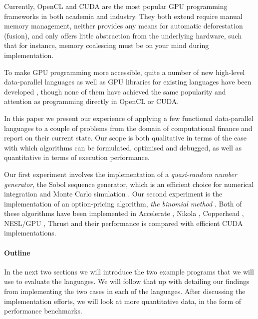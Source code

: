 \documentclass[preprint]{sigplanconf}
\begin{document}
Currently, OpenCL and CUDA are the most popular GPU programming
frameworks in both academia and industry. They both extend require
manual memory management, neither provides any means for automatic
deforestation (fusion), and only offers little abstraction from the
underlying hardware, such that for instance, memory coalescing must be
on your mind during implementation.

To make GPU programming more accessible, quite a number of new
high-level data-parallel languages as well as GPU libraries for
existing languages have been developed \cite{Catanzaro2011,
  chakravarty2011accelerating, mainland2010nikola,
  svensson2011obsidian, bergstra2010theano, homepage:rgpu,
  bergstrom2012nested, homepage:bohrium}, though none of them have
achieved the same popularity and attention as programming directly in
OpenCL or CUDA.

In this paper we present our experience of applying a few functional
data-parallel languages to a couple of problems from the domain of
computational finance and report on their current state. Our scope is
both qualitative in terms of the ease with which algorithms can be
formulated, optimised and debugged, as well as quantitative in terms
of execution performance.

Our first experiment involves the implementation of a
\emph{quasi-random number generator}, the Sobol sequence generator,
which is an efficient choice for numerical integration and Monte Carlo
simulation \cite{acworth1998comparison}. Our second experiment is the
implementation of an option-pricing algorithm, \emph{the binomial
  method} \cite{cox1979option}. Both of these algorithms have been
implemented in Accelerate \cite{chakravarty2011accelerating}, Nikola
\cite{mainland2010nikola}, Copperhead \cite{Catanzaro2011}, NESL/GPU
\cite{bergstrom2012nested}, Thrust \cite{Thrust} and their performance
is compared with efficient CUDA implementations.

\paragraph{Outline} In the next two sections we will introduce the two
example programs that we will use to evaluate the languages. We will
follow that up with detailing our findings from implementing the two
cases in each of the languages. After discussing the implementation
efforts, we will look at more quantitative data, in the form of
performance benchmarks.
\end{document}
